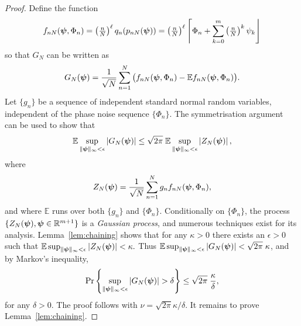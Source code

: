 \documentclass[aap]{imsart}
\newcommand{\reals}{{\mathbb R}}
\newcommand{\prob}{\operatorname{Pr}}
\newcommand{\expect}{{\mathbb E}}
\newcommand{\abs}[1]{\left\vert #1 \right\vert}
\newcommand{\round}[1]{{\left\lceil #1 \right\rfloor}}
\newcommand{\cubr}[1]{{\left\{ #1 \right\}}}
\begin{document}
\begin{proof}
Define the function 
\begin{align*}
f_{nN}(\psibf, \Phi_n) = \left( \tfrac{n}{N}\right)^\ell q_n(p_{nN}(\psibf)) = \left( \tfrac{n}{N}\right)^\ell \round{\Phi_n + \sum_{k=0}^m\left( \tfrac{n}{N}\right)^k\psi_k}
\end{align*}
so that $G_N$ can be written as
\[
G_N(\psibf) = \frac{1}{\sqrt{N}} \sum_{n=1}^{N} \big( f_{nN}(\psibf, \Phi_n) - \expect f_{nN}(\psibf, \Phi_n) \big).
\]
Let $\{g_n\}$ be a sequence of independent standard normal random variables, independent of the phase noise sequence $\{\Phi_n\}$.  The symmetrisation argument~\cite[Sec.~4]{Pollard_asymp_empi_proc_1989}\cite{Gine_Zinn_symmetrisation_1984,van2009empirical} can be used to show that 
\[
\expect \sup_{\|\psibf\|_{\infty} < \epsilon} \abs{ G_N(\psibf)} \leq \sqrt{2\pi} \; \expect \sup_{\|\psibf\|_{\infty} < \epsilon}  \abs{ Z_N(\psibf) },
\]
where 
\begin{equation}\label{eq:ZpsiCondGaussProc}
Z_N(\psibf) = \frac{1}{\sqrt{N}} \sum_{n=1}^{N} g_n f_{nN}(\psibf, \Phi_n),
\end{equation}
and where $\expect$ runs over both $\{g_n\}$ and $\{\Phi_n\}$.  Conditionally on $\{\Phi_n\}$, the process $\{Z_N(\psibf), \psibf \in \reals^{m+1} \}$ is a \emph{Gaussian process}, and numerous techniques exist for its analysis.  Lemma~\ref{lem:chaining} shows that for any $\kappa > 0$ there exists an $\epsilon > 0$ such that $\expect \sup_{\|\psibf\|_{\infty} < \epsilon} \abs{ Z_N(\psibf) } < \kappa.$  Thus $\expect \sup_{\|\psibf\|_{\infty} < \epsilon} \abs{ G_N(\psibf)}  <  \sqrt{2\pi} \; \kappa$, and by Markov's inequality,
\[
\prob \cubr{  \sup_{\|\psibf\|_{\infty} < \epsilon} \abs{ G_N(\psibf)} > \delta } \leq  \sqrt{2\pi} \; \frac{\kappa}{\delta},
\]
for any $\delta > 0$.  The proof follows with $\nu =  \sqrt{2\pi} \kappa/\delta$.  It remains to prove Lemma~\ref{lem:chaining}.

\end{proof}

\end{document}
